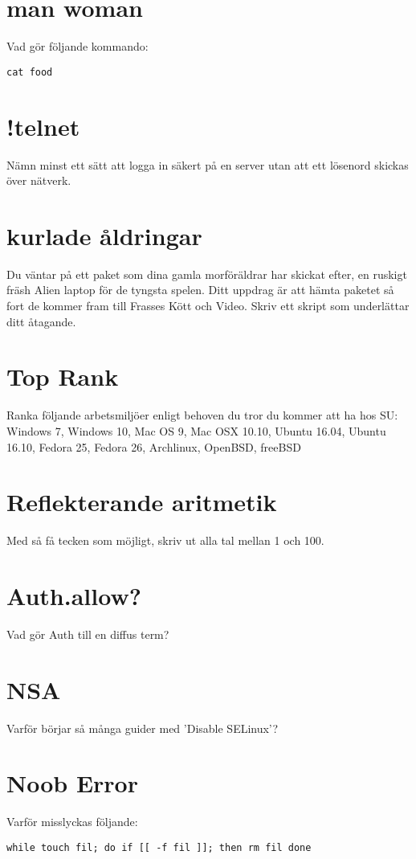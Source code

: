 \documentclass[a4paper]{report}
\begin{document}
\section{man woman}
Vad gör följande kommando:
\begin{verbatim}
cat food
\end{verbatim}

\section{!telnet}
Nämn minst ett sätt att logga in säkert på en server utan att ett lösenord skickas över nätverk.

\section{kurlade åldringar}
Du väntar på ett paket som dina gamla morföräldrar har skickat efter, en ruskigt fräsh Alien laptop för de tyngsta spelen. Ditt uppdrag är att hämta paketet så fort de kommer fram till Frasses Kött och Video. Skriv ett skript som underlättar ditt åtagande.

\section{Top Rank}
Ranka följande arbetsmiljöer enligt behoven du tror du kommer att ha hos SU:
Windows 7, Windows 10, Mac OS 9, Mac OSX 10.10, Ubuntu 16.04, Ubuntu 16.10, Fedora 25, Fedora 26, Archlinux, OpenBSD, freeBSD

\section{Reflekterande  aritmetik}
Med så få tecken som möjligt, skriv ut alla tal mellan 1 och 100.

\section{Auth.allow?}
Vad gör Auth till en diffus term?

\section{NSA}
Varför börjar så många guider med 'Disable SELinux'?

\section{Noob Error}
Varför misslyckas följande:
\begin{verbatim}
while touch fil; do if [[ -f fil ]]; then rm fil done
\end{verbatim}
\end{document}
